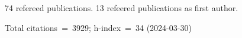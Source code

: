 74 refereed publications. 13 refeered publications as first author.

Total citations~=~3929; h-index~=~34 (2024-03-30)